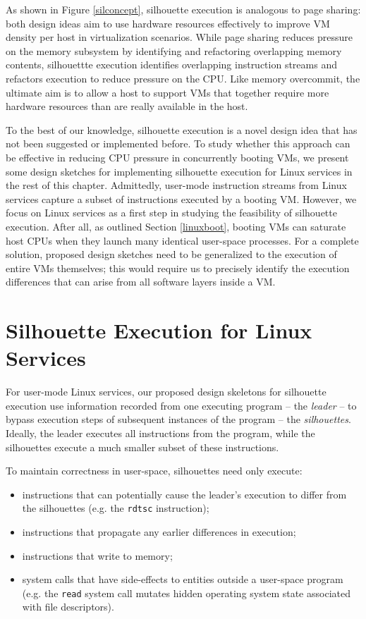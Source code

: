 As shown in Figure \ref{silconcept},
silhouette execution is analogous
to page sharing:
both design ideas aim to use hardware
resources effectively to improve VM density per host
in virtualization scenarios.
While page sharing reduces
pressure on the memory subsystem
by identifying and refactoring
overlapping memory contents,
silhouettte execution identifies
overlapping instruction streams
and refactors execution to
reduce pressure on the CPU.
Like memory overcommit,
the ultimate aim is to allow a host 
to support VMs that together require
more hardware resources than are really available
in the host.

To the best of our knowledge, silhouette execution is a novel
design idea that has not been
suggested or implemented before.
To study whether this approach
can be effective in reducing CPU pressure
in concurrently booting VMs,
we present some design sketches for implementing silhouette
execution for Linux services in the rest of this chapter. Admittedly,
user-mode instruction streams 
from Linux services capture
a subset of instructions
executed by a booting VM.
However, we focus on 
Linux services as a first step in
studying the feasibility of 
silhouette execution.
After all, as outlined
Section \ref{linuxboot}, booting VMs
can saturate host CPUs when they launch many
identical user-space processes.
For a complete solution, proposed design sketches need to be 
generalized to the execution of entire
VMs themselves; this would require us to precisely
identify the execution differences that can
arise from all software layers inside a VM. \newline

\section{Silhouette Execution for Linux Services} \label{subsil}
For user-mode Linux services, our
proposed design skeletons for silhouette execution
use  information recorded from one
executing program -- the {\em leader} -- to
bypass execution steps of subsequent instances
of the program  -- the {\em silhouettes}. 
Ideally, the leader executes all instructions from the program, 
while the silhouettes execute a much smaller subset
of these instructions.  

\newpage
To maintain correctness in user-space,
silhouettes need only execute: 

\begin{itemize}
\item instructions that can potentially cause the leader's
  execution to differ from the silhouettes (e.g. the \texttt{rdtsc}
  instruction); 
\item instructions that propagate any earlier differences in execution; 
\item instructions that write to memory;
\item system calls that have side-effects to entities
  outside a user-space program
  (e.g. the \texttt{read} system call mutates hidden operating system 
  state associated with file descriptors).
\end{itemize}

